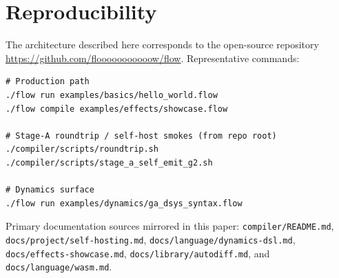 \documentclass[11pt,a4paper]{article}
\theoremstyle{remark}
\begin{document}
\section*{Reproducibility}
\label{sec:repro}

The architecture described here corresponds to the open-source repository
\url{https://github.com/flooooooooooow/flow}. Representative commands:

\begin{lstlisting}[basicstyle=\ttfamily\scriptsize]
# Production path
./flow run examples/basics/hello_world.flow
./flow compile examples/effects/showcase.flow

# Stage-A roundtrip / self-host smokes (from repo root)
./compiler/scripts/roundtrip.sh
./compiler/scripts/stage_a_self_emit_g2.sh

# Dynamics surface
./flow run examples/dynamics/ga_dsys_syntax.flow
\end{lstlisting}

Primary documentation sources mirrored in this paper:
\texttt{compiler/README.md}, \texttt{docs/project/self-hosting.md},
\texttt{docs/language/dynamics-dsl.md}, \texttt{docs/effects-showcase.md},
\texttt{docs/library/autodiff.md}, and \texttt{docs/language/wasm.md}.
\end{document}
